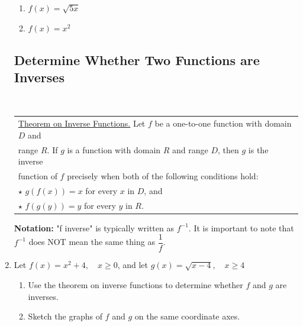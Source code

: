 \begin{enumerate}
\begin{enumerate}
\item $f(x) = \sqrt{5x}$
\vfill
\item $f(x) = x^2$
\end{enumerate}
\vfill


\newpage


\subsection{Determine Whether Two Functions are Inverses} ~


\noindent \begin{tabular}{ | l  |} \hline
\noindent \underline{Theorem on Inverse Functions.} Let $f$ be a one-to-one function with domain $D$ and  \\ range $R$. If $g$ is a function with domain $R$ and range $D$, then $g$ is the inverse \\ function of $f$ precisely when both of the following conditions hold:   \\ 
$ \star$ \quad $g(f(x))=x$ for every $x$ in $D$, and \\
$ \star$ \quad $f(g(y))=y$ for every $y$ in $R$.\\ \hline
\end{tabular} 

\noindent \textbf{Notation:}  "f inverse" is typically written as $f^{-1}$. It is important to note that $f^{-1}$ does NOT mean the same thing as $\dfrac{1}{f}$.


\item Let $f(x) = x^2+4, \quad x \geq 0$, and let $g(x) = \sqrt{x-4}, \quad x \geq 4 $

\begin{enumerate}
\item Use the theorem on inverse functions to determine whether $f$ and $g$ are inverses.  \\[2in]
\item Sketch the graphs of $f$ and $g$ on the same coordinate axes.


\end{enumerate}
\end{enumerate}
